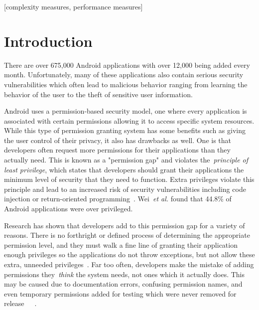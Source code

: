 \documentclass{sig-alternate}
\begin{document}
[complexity measures, performance measures]

\terms{}


\section{Introduction}

There are over 675,000 Android applications with over 12,000 being added every month.  Unfortunately, many of these applications also contain serious security vulnerabilities which often lead to malicious behavior ranging from learning the behavior of the user to the theft of sensitive user information. 



Android uses a permission-based security model, one where every application is associated with certain permissions allowing it to access specific system resources. While this type of permission granting system has some benefits such as giving the user control of their privacy, it also has drawbacks as well. One is that developers often request more permissions for their applications than they actually need. This is known as a "permission gap" and violates the~\emph{principle of least privilege}, which states that developers should grant their applications the minimum level of security that they need to function. Extra privileges violate this principle and lead to an increased risk of security vulnerabilities including code injection or return-oriented programming~\cite{Davi:2010:PEA:1949317.1949356}. Wei~\emph{et al.} found that 44.8\% of Android applications were over privileged.

Research has shown that developers add to this permission gap for a variety of reasons. There is no forthright or defined process of determining the appropriate permission level, and they must walk a fine line of granting their application enough privileges so the applications do not throw exceptions, but not allow these extra, unneeded privileges~\cite{Vidas11curbingandroid}.  Far too often, developers make the mistake of adding permissions they~\emph{think} the system needs, not ones which it actually does. This may be caused due to documentation errors, confusing permission names, and even temporary permissions added for testing which were never removed for release~\cite{Bartel:2012:ASP:2351676.2351722}~\cite{Wei:2012:PEA:2420950.2420956}~\cite{Felt:2011:APD:2046707.2046779}.
\end{document}
